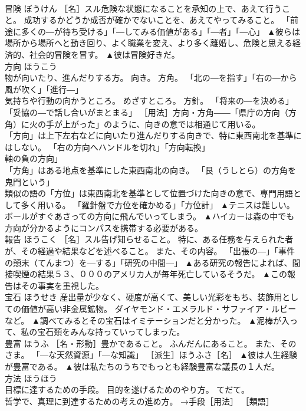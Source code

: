 \documentclass[8pt]{extreport}
\begin{document}
\begin{CJK}{UTF8}{min}
\\	冒険	ぼうけん	［名］スル危険な状態になることを承知の上で、あえて行うこと。 成功するかどうか成否が確かでないことを、あえてやってみること。 「前途に多くの―が待ち受ける」「―してみる価値がある」「―者」「―心」	▲彼らは場所から場所へと動き回り、よく職業を変え、より多く離婚し、危険と思える経済的、社会的冒険を冒す。 ▲彼は冒険好きだ。
\\	方向	ほうこう	
\\	物が向いたり、進んだりする方。 向き。 方角。 「北の―を指す」「右の―から風が吹く」「進行―」 
\\	気持ちや行動の向かうところ。 めざすところ。 方針。 「将来の―を決める」「妥協の―で話し合いがまとまる」 ［用法］方向・方角――「県庁の方向（方角）に火の手が上がった」のように、向きの意では相通じて用いる。 
\\	「方向」は上下左右などに向いたり進んだりする向きで、特に東西南北を基準にはしない。 「右の方向へハンドルを切れ」「方向転換」
\\	軸の負の方向」
\\	「方角」はある地点を基準にした東西南北の向き。 「艮（うしとら）の方角を鬼門という」
\\	類似の語の「方位」は東西南北を基準として位置づけた向きの意で、専門用語として多く用いる。 「羅針盤で方位を確かめる」「方位計」	▲テニスは難しい。ボールがすぐあさっての方向に飛んでいってしまう。 ▲ハイカーは森の中でも方向が分かるようにコンパスを携帯する必要がある。
\\	報告	ほうこく	［名］スル告げ知らせること。 特に、ある任務を与えられた者が、その経過や結果などを述べること。 また、その内容。 「出張の―」「事件の顛末（てんまつ）を―する」「研究の中間―」	▲ある研究の報告によれば、間接喫煙の結果５３、０００のアメリカ人が毎年死亡しているそうだ。 ▲この報告はその事実を重視した。
\\	宝石	ほうせき	産出量が少なく、硬度が高くて、美しい光彩をもち、装飾用としての価値が高い非金属鉱物。 ダイヤモンド・エメラルド・サファイア・ルビーなど。	▲調べてみるとその宝石はイミテーションだと分かった。 ▲泥棒が入って、私の宝石類をみんな持っていってしまった。
\\	豊富	ほうふ	［名・形動］豊かであること。 ふんだんにあること。 また、そのさま。 「―な天然資源」「―な知識」 ［派生］ほうふさ［名］	▲彼は人生経験が豊富である。 ▲彼は私たちのうちでもっとも経験豊富な議長の１人だ。
\\	方法	ほうほう	
\\	目標に達するための手段。 目的を遂げるためのやり方。 てだて。 
\\	哲学で、真理に到達するための考えの進め方。 →手段［用法］ ［類語］

\end{CJK}
\end{document}

